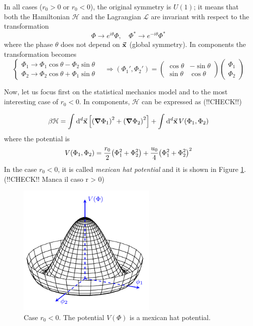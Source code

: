 \documentclass[../../Main/Main.tex]{subfiles}
\begin{document}
In all cases (\( r_0 > 0 \) or \( r_0 < 0 \)), the original symmetry is \( U(1) \); it means that both the Hamiltonian \( \mathcal{H} \) and the Lagrangian \( \mathcal{L} \) are invariant with respect to the transformation
\begin{equation}
  \Phi \rightarrow e^{i \theta } \Phi , \quad \Phi ^* \rightarrow e^{-i \theta } \Phi ^*
\end{equation}
where the phase \( \theta  \) does not depend on \( \va{x} \) (global symmetry).
In components the transformation becomes
\begin{equation*}
  \begin{cases}
   \Phi _1 \rightarrow  \Phi _1 \cos \theta - \Phi _2 \sin \theta \\
  \Phi _2 \rightarrow  \Phi _2 \cos \theta + \Phi _1 \sin \theta
  \end{cases}
  \quad \Rightarrow
  (\Phi _1', \Phi _2') = \begin{pmatrix}
  \cos \theta    & - \sin \theta   \\
    \sin \theta  & \cos \theta
  \end{pmatrix}
  \begin{pmatrix}
  \Phi _1 \\
  \Phi _2
  \end{pmatrix}
\end{equation*}

Now, let us focus first on the statistical mechanics model and to the most interesting case of \( r_0 <0 \).
In components, \( \mathcal{H} \) can be expressed as (!!CHECK!!)

\begin{equation}
  \beta \mathcal{H} = \int_{}^{} \dd[d]{\va{x}} \qty[\qty(\grad \Phi _1)^2 + \qty(\grad \Phi _2)^2  ] + \int_{}^{} \dd[d]{\va{x}} V (\Phi _1, \Phi _2)
\end{equation}
where the potential is
\begin{equation}
  V (\Phi _1, \Phi _2) = \frac{r_0}{2} \qty(\Phi _1^2 + \Phi _2^2) + \frac{u_0}{4} \qty( \Phi _1^2 + \Phi _2^2)^2
  \label{eq:n_6}
\end{equation}
In the case \( r_0 < 0 \), it is called \emph{mexican hat potential} and it is shown in Figure \ref{fig:n_1}. (!!CHECK!! Manca il caso r > 0)

\begin{figure}[H]
\centering
\includegraphics[width=0.6\textwidth]{./img/3.pdf}
\caption{\label{fig:n_1} Case \( r_0 < 0 \). The potential \( V(\Phi ) \) is a mexican hat potential.}
\end{figure}
\end{document}
